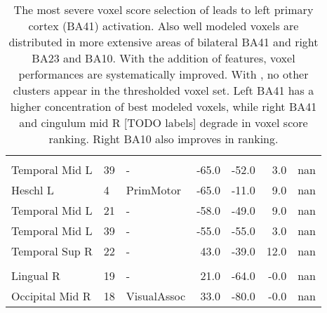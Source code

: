 \begin{table}
    \small
    \centering
    \begin{ThreePartTable}
    \begin{tabularx}{\textwidth}{L l L *{3}{r} *{1}{R}}
     \\
    \toprule
     &  &  &  &  &  & \\
    \toprule

    Temporal Mid L & 39 & - & -65.0 & -52.0 & 3.0 & nan \\
Heschl L & 4 & PrimMotor & -65.0 & -11.0 & 9.0 & nan \\
Temporal Mid L & 21 & - & -58.0 & -49.0 & 9.0 & nan \\
Temporal Mid L & 39 & - & -55.0 & -55.0 & 3.0 & nan \\
Temporal Sup R & 22 & - & 43.0 & -39.0 & 12.0 & nan \\

\toprule
{} \\
Lingual R & 19 & - & 21.0 & -64.0 & -0.0 & nan \\
Occipital Mid R & 18 & VisualAssoc & 33.0 & -80.0 & -0.0 & nan \\
\bottomrule
    \end{tabularx}
\end{ThreePartTable}
\caption[ F-test Significant Voxels]{The most severe voxel score selection of  leads to left primary cortex (BA41) activation. Also well modeled voxels are distributed in more extensive areas of bilateral BA41 and right BA23 and BA10. With the addition of  features, voxel performances are systematically improved. With , no other clusters appear in the thresholded voxel set. Left BA41 has a higher concentration of best modeled voxels, while right BA41 and cingulum mid R [TODO labels] degrade in voxel score ranking. Right BA10 also improves in ranking. \label{tab:simF}}
\end{table}